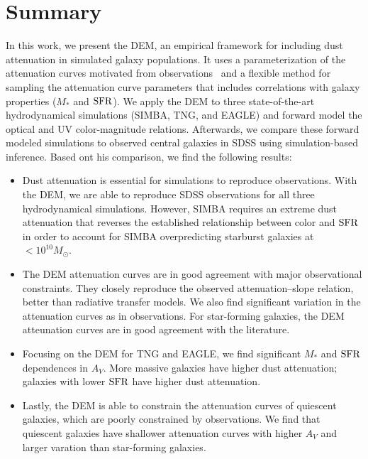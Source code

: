 \section{Summary}
In this work, we present the DEM, an empirical framework for including dust
attenuation in simulated galaxy populations. It uses a parameterization of 
the attenuation curves motivated from observations~\citep[][]{noll2009} and a
flexible method for sampling the attenuation curve parameters that includes
correlations with galaxy properties ($M_*$ and ${\rm SFR}$). We apply the DEM to 
three state-of-the-art hydrodynamical simulations (SIMBA, TNG, and EAGLE) and
forward model the optical and UV color-magnitude relations. Afterwards, we
compare these forward modeled simulations to observed central galaxies in SDSS
using simulation-based inference. Based ont his comparison, we find the
following results: 

\begin{itemize}
\item Dust attenuation is essential for simulations to reproduce observations.
With the DEM, we are able to reproduce SDSS observations for all three hydrodynamical 
simulations. However, SIMBA requires an extreme dust attenuation that reverses 
the established relationship between color and ${\rm SFR}$ in order to account for
SIMBA overpredicting starburst galaxies at $<10^{10}M_\odot$.
\item The DEM attenuation curves are in good agreement with major observational 
constraints. They closely reproduce the observed attenuation--slope relation,
better than radiative transfer models. We also find significant variation in 
the attenuation curves as in observations. For star-forming galaxies, the DEM
atteunation curves are in good agreement with the literature.  
\item Focusing on the DEM for TNG and EAGLE, we find significant $M_*$ and
${\rm SFR}$ dependences in $A_V$. More massive galaxies have higher dust
attenuation; galaxies with lower ${\rm SFR}$ have  higher dust attenuation. 
\item Lastly, the DEM is able to constrain the attenuation curves of quiescent
galaxies, which are poorly constrained by observations. We find that quiescent
galaxies have shallower attenuation curves with higher $A_V$ and larger
varation than star-forming galaxies. 
\end{itemize}

